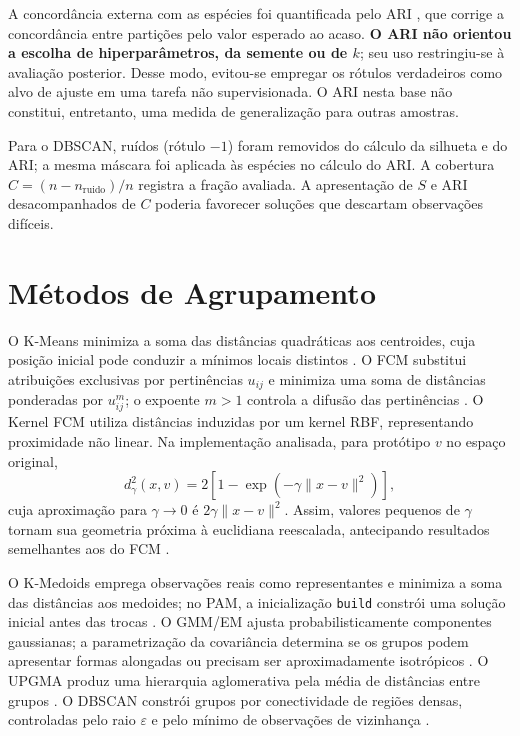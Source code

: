 \documentclass[conference,a4paper]{IEEEtran}
\begin{document}
A concordância externa com as espécies foi quantificada pelo ARI \cite{hubert}, que corrige a concordância entre partições pelo valor esperado ao acaso. \textbf{O ARI não orientou a escolha de hiperparâmetros, da semente ou de $k$}; seu uso restringiu-se à avaliação posterior. Desse modo, evitou-se empregar os rótulos verdadeiros como alvo de ajuste em uma tarefa não supervisionada. O ARI nesta base não constitui, entretanto, uma medida de generalização para outras amostras.

Para o DBSCAN, ruídos (rótulo $-1$) foram removidos do cálculo da silhueta e do ARI; a mesma máscara foi aplicada às espécies no cálculo do ARI. A cobertura $C=(n-n_{\mathrm{ruido}})/n$ registra a fração avaliada. A apresentação de $S$ e ARI desacompanhados de $C$ poderia favorecer soluções que descartam observações difíceis.

\section{Métodos de Agrupamento}
O K-Means minimiza a soma das distâncias quadráticas aos centroides, cuja posição inicial pode conduzir a mínimos locais distintos \cite{macqueen}. O FCM substitui atribuições exclusivas por pertinências $u_{ij}$ e minimiza uma soma de distâncias ponderadas por $u_{ij}^{m}$; o expoente $m>1$ controla a difusão das pertinências \cite{bezdek}. O Kernel FCM utiliza distâncias induzidas por um kernel RBF, representando proximidade não linear. Na implementação analisada, para protótipo $v$ no espaço original,
\begin{equation}
 d_\gamma^2(x,v)=2[1-\exp(-\gamma\lVert x-v\rVert^2)],
 \label{eq:kernel}
\end{equation}
cuja aproximação para $\gamma\to0$ é $2\gamma\lVert x-v\rVert^2$. Assim, valores pequenos de $\gamma$ tornam sua geometria próxima à euclidiana reescalada, antecipando resultados semelhantes aos do FCM \cite{graves,zhang}.

O K-Medoids emprega observações reais como representantes e minimiza a soma das distâncias aos medoides; no PAM, a inicialização \texttt{build} constrói uma solução inicial antes das trocas \cite{kaufman}. O GMM/EM ajusta probabilisticamente componentes gaussianas; a parametrização da covariância determina se os grupos podem apresentar formas alongadas ou precisam ser aproximadamente isotrópicos \cite{dempster}. O UPGMA produz uma hierarquia aglomerativa pela média de distâncias entre grupos \cite{sokal}. O DBSCAN constrói grupos por conectividade de regiões densas, controladas pelo raio $\varepsilon$ e pelo mínimo de observações de vizinhança \cite{ester}.
\end{document}
